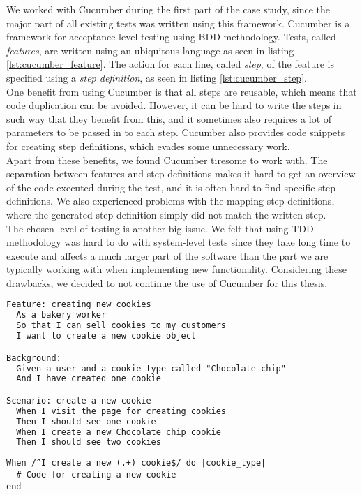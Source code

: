 
We worked with Cucumber during the first part of the case study, since
the major part of all existing tests was written using this framework.
Cucumber is a framework for acceptance-level testing using BDD
methodology. Tests, called \emph{features}, are written using an
ubiquitous language as seen in listing \ref{lst:cucumber_feature}. The
action for each line, called \emph{step}, of the feature is specified
using a \emph{step definition}, as seen in listing
\ref{lst:cucumber_step}.\cite{web:cucumber}\\

One benefit from using Cucumber is that all steps are reusable, which
means that code duplication can be avoided. However, it can be hard to
write the steps in such way that they benefit from this, and it
sometimes also requires a lot of parameters to be passed in to each
step. Cucumber also provides code snippets for creating step
definitions, which evades some unnecessary work.\\

Apart from these benefits, we found Cucumber tiresome to work with. The
separation between features and step definitions makes it hard to get an
overview of the code executed during the test, and it is often hard to
find specific step definitions. We also experienced problems with the
mapping step definitions, where the generated step definition simply did
not match the written step.\\

The chosen level of testing is another big issue. We felt that using
TDD-methodology was hard to do with system-level tests since they take
long time to execute and affects a much larger part of the software than
the part we are typically working with when implementing new
functionality. Considering these drawbacks, we decided to not continue
the use of Cucumber for this thesis.\\


\begin{lstlisting}[caption=Example of a Cucumber test.,
                   label=lst:cucumber_feature, float=t, language=HTML]
Feature: creating new cookies
  As a bakery worker
  So that I can sell cookies to my customers
  I want to create a new cookie object

Background:
  Given a user and a cookie type called "Chocolate chip"
  And I have created one cookie

Scenario: create a new cookie
  When I visit the page for creating cookies
  Then I should see one cookie
  When I create a new Chocolate chip cookie
  Then I should see two cookies
\end{lstlisting}


\begin{lstlisting}[caption=Cucumber step definition for the step on row 13 in code listing \ref{lst:cucumber_feature}.,
                   label=lst:cucumber_step, float=t]
When /^I create a new (.+) cookie$/ do |cookie_type|
  # Code for creating a new cookie
end
\end{lstlisting}

